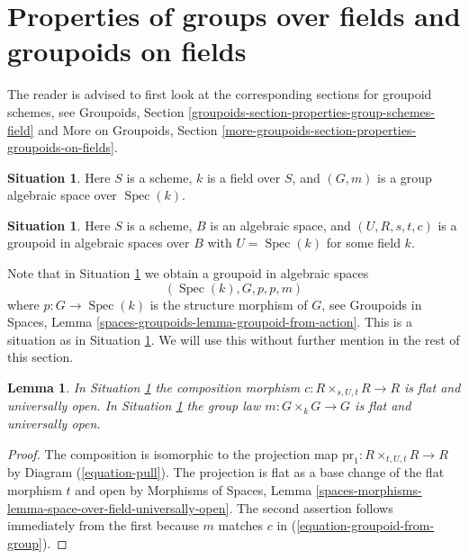 \documentclass{stacks-project}
\theoremstyle{plain}
\newtheorem{lemma}[subsection]{Lemma}
\theoremstyle{definition}
\newtheorem{situation}[subsection]{Situation}
\theoremstyle{remark}
\numberwithin{equation}{subsection}
\def\Spec{\mathop{\mathrm{Spec}}}
\begin{document}
\section{Properties of groups over fields and groupoids on fields}
\label{section-properties-groupoids-on-fields}

\noindent
The reader is advised to first look at the corresponding sections for
groupoid schemes, see
Groupoids, Section \ref{groupoids-section-properties-group-schemes-field}
and
More on Groupoids,
Section \ref{more-groupoids-section-properties-groupoids-on-fields}.

\begin{situation}
\label{situation-group-over-field}
Here $S$ is a scheme, $k$ is a field over $S$, and
$(G, m)$ is a group algebraic space over $\Spec(k)$.
\end{situation}

\begin{situation}
\label{situation-groupoid-on-field}
Here $S$ is a scheme, $B$ is an algebraic space, and
$(U, R, s, t, c)$ is a groupoid in algebraic spaces over $B$
with $U = \Spec(k)$ for some field $k$.
\end{situation}

\noindent
Note that in
Situation \ref{situation-group-over-field}
we obtain a groupoid in algebraic spaces
\begin{equation}
\label{equation-groupoid-from-group}
(\Spec(k), G, p, p, m)
\end{equation}
where $p : G \to \Spec(k)$ is the structure morphism of $G$, see
Groupoids in Spaces, Lemma \ref{spaces-groupoids-lemma-groupoid-from-action}.
This is a situation as in
Situation \ref{situation-groupoid-on-field}.
We will use this without further mention in the rest of this section.

\begin{lemma}
\label{lemma-groupoid-on-field-open-multiplication}
In
Situation \ref{situation-groupoid-on-field}
the composition morphism $c : R \times_{s, U, t} R \to R$ is flat and
universally open.
In
Situation \ref{situation-group-over-field}
the group law $m : G \times_k G \to G$ is flat and
universally open.
\end{lemma}

\begin{proof}
The composition is isomorphic to the projection map
$\text{pr}_1 : R \times_{t, U, t} R \to R$ by
Diagram (\ref{equation-pull}).
The projection is flat as a base change of the flat morphism $t$
and open by
Morphisms of Spaces,
Lemma \ref{spaces-morphisms-lemma-space-over-field-universally-open}.
The second assertion follows immediately from the first because
$m$ matches $c$ in (\ref{equation-groupoid-from-group}).
\end{proof}
\end{document}

